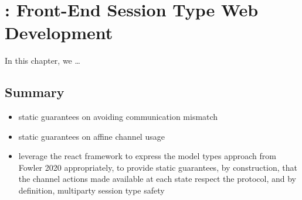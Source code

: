 \chapter{: Front-End Session Type Web Development}
\label{chap:react}

In this chapter, we
\dots








\section{Summary}
\begin{itemize}
\item static guarantees on avoiding communication mismatch
\item static guarantees on affine channel usage
\item leverage the react framework to express the model types approach from Fowler 2020 appropriately, to provide static guarantees, by construction, that the channel actions made available at each state respect the protocol, and by definition, multiparty session type safety
\end{itemize}